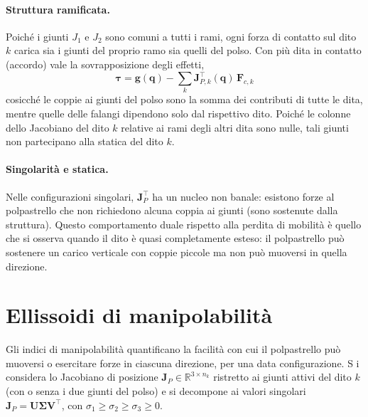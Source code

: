 \paragraph{Struttura ramificata.} Poiché i giunti $J_1$ e $J_2$ sono comuni a tutti i rami, ogni forza di contatto sul dito $k$ carica sia i giunti del proprio ramo sia quelli del polso. Con più dita in contatto (accordo) vale la sovrapposizione degli effetti,
\begin{equation}
    \boldsymbol\tau=\boldsymbol g(\boldsymbol q)-\sum_{k}\boldsymbol J_{P,k}^\top(\boldsymbol q)\,\boldsymbol F_{c,k}
\end{equation}
cosicché le coppie ai giunti del polso sono la somma dei contributi di tutte le dita, mentre quelle delle falangi dipendono solo dal rispettivo dito. Poiché le colonne dello Jacobiano del dito $k$ relative ai rami degli altri dita sono nulle, tali giunti non partecipano alla statica del dito $k$.

\paragraph{Singolarità e statica.} Nelle configurazioni singolari, $\boldsymbol J_P^\top$ ha un nucleo non banale: esistono forze al polpastrello che non richiedono alcuna coppia ai giunti (sono sostenute dalla struttura). Questo comportamento duale rispetto alla perdita di mobilità è quello che si osserva quando il dito è quasi completamente esteso: il polpastrello può sostenere un carico verticale con coppie piccole ma non può muoversi in quella direzione.

\clearpage
\section{Ellissoidi di manipolabilità}
\label{sec:manipulability_ellipsoids}

Gli indici di manipolabilità quantificano la facilità con cui il polpastrello può muoversi o esercitare forze in ciascuna direzione, per una data configurazione. S
i considera lo Jacobiano di posizione $\boldsymbol J_P\in\mathbb R^{3\times n_k}$ ristretto ai giunti attivi del dito $k$ (con o senza i due giunti del polso) e si decompone ai valori singolari $\boldsymbol J_P=\boldsymbol U\boldsymbol\Sigma\boldsymbol V^\top$, con $\sigma_1\ge\sigma_2\ge\sigma_3\ge 0$.

